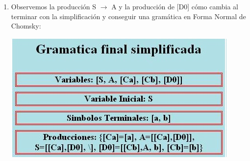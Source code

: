 \documentclass[12pt,a4paper,spanish]{book}
\begin{document}
\begin{enumerate}
\begin{center}
\end{center}
\item Observemos la producci\'on S $\rightarrow$ A y la producci\'on de [D0] c\'omo cambia al terminar con la simplificaci\'on y conseguir una gram\'atica en Forma Normal de Chomsky:\\
\begin{center}
\includegraphics{chom5.jpg}
\end{center}
\end{enumerate}

\newpage
\end{document}
